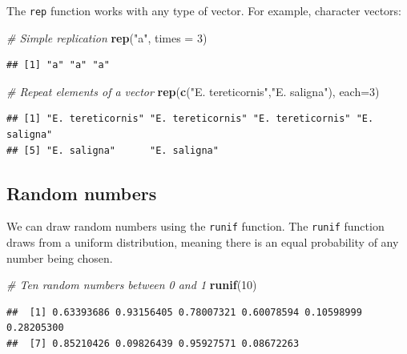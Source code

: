 \documentclass[]{book}
\newenvironment{Shaded}{\begin{snugshade}}{\end{snugshade}}
\newcommand{\CommentTok}[1]{\textcolor[rgb]{0.56,0.35,0.01}{\textit{#1}}}
\newcommand{\DataTypeTok}[1]{\textcolor[rgb]{0.13,0.29,0.53}{#1}}
\newcommand{\DecValTok}[1]{\textcolor[rgb]{0.00,0.00,0.81}{#1}}
\newcommand{\KeywordTok}[1]{\textcolor[rgb]{0.13,0.29,0.53}{\textbf{#1}}}
\newcommand{\NormalTok}[1]{#1}
\newcommand{\StringTok}[1]{\textcolor[rgb]{0.31,0.60,0.02}{#1}}
\begin{document}
The \texttt{rep} function works with any type of vector. For example, character vectors:

\begin{Shaded}
\begin{Highlighting}[]
\CommentTok{# Simple replication}
\KeywordTok{rep}\NormalTok{(}\StringTok{"a"}\NormalTok{, }\DataTypeTok{times =} \DecValTok{3}\NormalTok{)}
\end{Highlighting}
\end{Shaded}

\begin{verbatim}
## [1] "a" "a" "a"
\end{verbatim}

\begin{Shaded}
\begin{Highlighting}[]
\CommentTok{# Repeat elements of a vector}
\KeywordTok{rep}\NormalTok{(}\KeywordTok{c}\NormalTok{(}\StringTok{"E. tereticornis"}\NormalTok{,}\StringTok{"E. saligna"}\NormalTok{), }\DataTypeTok{each=}\DecValTok{3}\NormalTok{)}
\end{Highlighting}
\end{Shaded}

\begin{verbatim}
## [1] "E. tereticornis" "E. tereticornis" "E. tereticornis" "E. saligna"     
## [5] "E. saligna"      "E. saligna"
\end{verbatim}

\hypertarget{randomnumbers}{%
\subsection{Random numbers}\label{randomnumbers}}

We can draw random numbers using the \texttt{runif} function. The \texttt{runif} function draws from a uniform distribution, meaning there is an equal probability of any number being chosen.

\begin{Shaded}
\begin{Highlighting}[]
\CommentTok{# Ten random numbers between 0 and 1}
\KeywordTok{runif}\NormalTok{(}\DecValTok{10}\NormalTok{)}
\end{Highlighting}
\end{Shaded}

\begin{verbatim}
##  [1] 0.63393686 0.93156405 0.78007321 0.60078594 0.10598999 0.28205300
##  [7] 0.85210426 0.09826439 0.95927571 0.08672263
\end{verbatim}
\end{document}
